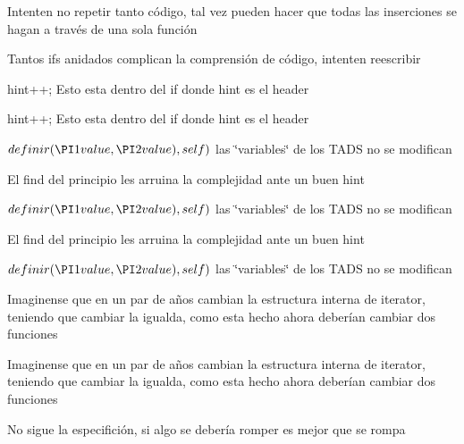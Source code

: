 \begin{DoxyRefList}
Intenten no repetir tanto código, tal vez pueden hacer que todas las inserciones se hagan a través de una sola función 

Tantos ifs anidados complican la comprensión de código, intenten reescribir

hint++; Esto esta dentro del if donde hint es el header 

hint++; Esto esta dentro del if donde hint es el header  
\item[\label{deprecated__deprecated000014}%
\hypertarget{deprecated__deprecated000014}{}%
Miembro \hyperlink{classaed2_1_1map_a2ef6723c183916276b0afc4a4c721475_a2ef6723c183916276b0afc4a4c721475}{aed2\+:\+:map$<$ Key, Meaning, Compare $>$\+:\+:insert\+\_\+or\+\_\+assign} (\hyperlink{classaed2_1_1map_1_1const__iterator}{const\+\_\+iterator} hint, const value\+\_\+type \&value)]$ definir(\PI1 value, \PI2 value), self) $ las \char`\"{}variables\char`\"{} de los T\+A\+DS no se modifican

El find del principio les arruina la complejidad ante un buen hint

$ definir(\PI1 value, \PI2 value), self) $ las \char`\"{}variables\char`\"{} de los T\+A\+DS no se modifican

El find del principio les arruina la complejidad ante un buen hint

$ definir(\PI1 value, \PI2 value), self) $ las \char`\"{}variables\char`\"{} de los T\+A\+DS no se modifican 
\item[\label{deprecated__deprecated000025}%
\hypertarget{deprecated__deprecated000025}{}%
Miembro \hyperlink{classaed2_1_1map_1_1iterator_a836c7a166d63f507c4f79085ae953c51_a836c7a166d63f507c4f79085ae953c51}{aed2\+:\+:map$<$ Key, Meaning, Compare $>$\+:\+:iterator\+:\+:operator!=} (iterator other) const ]Imaginense que en un par de años cambian la estructura interna de iterator, teniendo que cambiar la igualda, como esta hecho ahora deberían cambiar dos funciones

Imaginense que en un par de años cambian la estructura interna de iterator, teniendo que cambiar la igualda, como esta hecho ahora deberían cambiar dos funciones 
\item[\label{deprecated__deprecated000023}%
\hypertarget{deprecated__deprecated000023}{}%
Miembro \hyperlink{classaed2_1_1map_1_1iterator_a7c44de7f0508186e135ddbcfe782fec5_a7c44de7f0508186e135ddbcfe782fec5}{aed2\+:\+:map$<$ Key, Meaning, Compare $>$\+:\+:iterator\+:\+:operator++} ()]No sigue la especifición, si algo se debería romper es mejor que se rompa 


\end{DoxyRefList}
